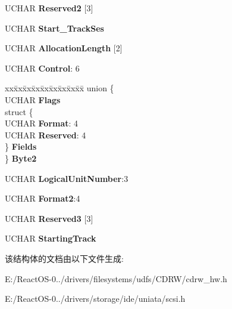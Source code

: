 \begin{DoxyCompactItemize}
\begin{tabbing}
\end{tabbing}\item 
\mbox{\label{struct___c_d_b_1_1___r_e_a_d___t_o_c_a7a0e3b7440a6cf79d6a26b8e170657e1}} 
U\+C\+H\+AR {\bfseries Reserved2} \mbox{[}3\mbox{]}
\item 
\mbox{\label{struct___c_d_b_1_1___r_e_a_d___t_o_c_ae68ed27bb47780108e6ca93c1ad84880}} 
U\+C\+H\+AR {\bfseries Start\+\_\+\+Track\+Ses}
\item 
\mbox{\label{struct___c_d_b_1_1___r_e_a_d___t_o_c_a63a55ce9427193ea2169987d0b1e9a29}} 
U\+C\+H\+AR {\bfseries Allocation\+Length} \mbox{[}2\mbox{]}
\item 
\mbox{\label{struct___c_d_b_1_1___r_e_a_d___t_o_c_a999683a60c40d0ccd91e8b83e50d52af}} 
U\+C\+H\+AR {\bfseries Control}\+: 6
\item 
\mbox{\label{struct___c_d_b_1_1___r_e_a_d___t_o_c_a4fe071cb2316a07257bf790717225ba3}} 
\begin{tabbing}
xx\=xx\=xx\=xx\=xx\=xx\=xx\=xx\=xx\=\kill
union \{\\
\>UCHAR {\bfseries Flags}\\
\>struct \{\\
\>\>UCHAR {\bfseries Format}: 4\\
\>\>UCHAR {\bfseries Reserved}: 4\\
\>\} {\bfseries Fields}\\
\} {\bfseries Byte2}\\

\end{tabbing}\item 
\mbox{\label{struct___c_d_b_1_1___r_e_a_d___t_o_c_acd7e2ccc91d3192b21bdf8f6a5dd2786}} 
U\+C\+H\+AR {\bfseries Logical\+Unit\+Number}\+:3
\item 
\mbox{\label{struct___c_d_b_1_1___r_e_a_d___t_o_c_af67eb43956a9b763fc1d0401a177da23}} 
U\+C\+H\+AR {\bfseries Format2}\+:4
\item 
\mbox{\label{struct___c_d_b_1_1___r_e_a_d___t_o_c_a69430cf6c0ff875dd07425606f8c75a6}} 
U\+C\+H\+AR {\bfseries Reserved3} \mbox{[}3\mbox{]}
\item 
\mbox{\label{struct___c_d_b_1_1___r_e_a_d___t_o_c_add515ef58e7b0de081428724540f0c8a}} 
U\+C\+H\+AR {\bfseries Starting\+Track}
\end{DoxyCompactItemize}


该结构体的文档由以下文件生成\+:\begin{DoxyCompactItemize}
\item 
E\+:/\+React\+O\+S-\/0../drivers/filesystems/udfs/\+C\+D\+R\+W/cdrw\+\_\+hw.\+h\item 
E\+:/\+React\+O\+S-\/0../drivers/storage/ide/uniata/scsi.\+h\end{DoxyCompactItemize}
